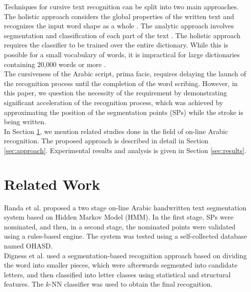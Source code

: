 \documentclass[10pt, conference, compsocconf]{IEEEtran}
\begin{document}
Techniques for cursive text recognition can be split into two main approaches. 
The holistic approach considers the global properties of the written text and recognizes the input word shape as a whole \cite{biadsy2011segmentation, saabni2009hierarchical}. 
The analytic approach involves segmentation and classification of each part of the text \cite{abdulla2008off, sari2002off, Dinges2011}. 
The holistic approach requires the classifier to be trained over the entire dictionary. 
While this is possible for a small vocabulary of words, it is impractical for large dictionaries containing 20,000 words or more \cite{elanwar2012unconstrained}.\\

The cursiveness of the Arabic script, prima facie, requires delaying the launch of the recognition process until the completion of the word scribing. 
However, in this paper, we question the necessity of the requirement by demonstrating significant acceleration of the recognition process, which was achieved by approximating the position of the segmentation points (SPs) while the stroke is being written.\\

In Section \ref{sec:related_work}, we mention related studies done in the field of on-line Arabic recognition. 
The proposed approach is described in detail in Section \ref{sec:approach}. Experimental results and analysis is given in Section \ref{sec:results}. \\

\section{Related Work}
\label{sec:related_work}

Randa et al. \cite{elanwar2012unconstrained} proposed a two stage on-line Arabic handwritten text segmentation system based on Hidden Markov Model (HMM). 
In the first stage, SPs were nominated, and then, in a second stage, the nominated points were validated using a rules-based engine. 
The system was tested using a self-collected database named OHASD.\\

Digness et al. \cite{Dinges2011} used a segmentation-based recognition approach based on dividing the word into smaller pieces, which were afterwards segmented into candidate letters, and then classified into letter classes using statistical and structural features. 
The $k$-NN classifier was used to obtain the final recognition.\\
\end{document}
